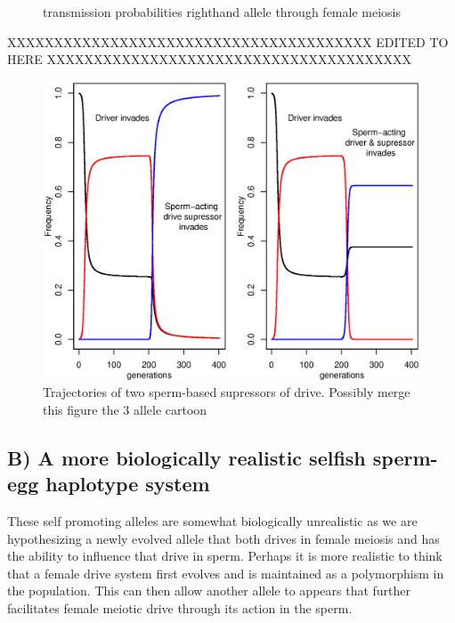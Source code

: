 \documentclass[12pt,letterpaper]{article}
\begin{document}
\begin{figure}
\caption{transmission probabilities righthand allele through female
  meiosis}  \label{Eggsperm_3_allele_cartoon}
\end{figure}


XXXXXXXXXXXXXXXXXXXXXXXXXXXXXXXXXXXXXXX\newline
EDITED TO HERE\newline
XXXXXXXXXXXXXXXXXXXXXXXXXXXXXXXXXXXXXXX\newline


\begin{figure}
\includegraphics[width = 0.8 \textwidth]{Figures/trajectories_of_sperm_based_supressors.eps} 
\caption{Trajectories of two sperm-based supressors of drive. Possibly
merge this figure the 3 allele cartoon}  \label{Trajectories_of_supressors}
\end{figure}

\subsection*{B) A more biologically realistic selfish sperm-egg haplotype system}
These self promoting alleles are somewhat biologically unrealistic as
we are hypothesizing a newly evolved allele  
that both drives in female meiosis and has the ability to influence that drive in sperm.
Perhaps it is more realistic to think that a female drive system first
evolves and is maintained as a polymorphism in the population. 
This can then allow another allele to appears that further facilitates
female meiotic drive through its action in the sperm. 
\end{document}
